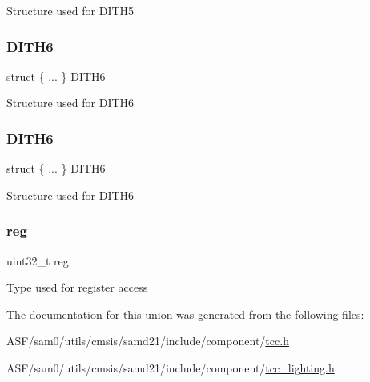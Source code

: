 Structure used for D\+I\+T\+H5 \mbox{\label{union_t_c_c___c_o_u_n_t___type_a3c35854a6526ba867ee4b060fb0174b6}} 
\subsubsection{\texorpdfstring{DITH6}{DITH6}\hspace{0.1cm}{\footnotesize\ttfamily [1/2]}}
{\footnotesize\ttfamily struct \{ ... \}   D\+I\+T\+H6}

Structure used for D\+I\+T\+H6 \mbox{\label{union_t_c_c___c_o_u_n_t___type_a45cbfa4ced52916c3eb023e920cc0015}} 
\subsubsection{\texorpdfstring{DITH6}{DITH6}\hspace{0.1cm}{\footnotesize\ttfamily [2/2]}}
{\footnotesize\ttfamily struct \{ ... \}   D\+I\+T\+H6}

Structure used for D\+I\+T\+H6 \mbox{\label{union_t_c_c___c_o_u_n_t___type_a6b91636401516a477989a336376d7b40}} 
\subsubsection{\texorpdfstring{reg}{reg}}
{\footnotesize\ttfamily uint32\+\_\+t reg}

Type used for register access 

The documentation for this union was generated from the following files\+:\begin{DoxyCompactItemize}
\item 
A\+S\+F/sam0/utils/cmsis/samd21/include/component/\mbox{\hyperlink{tcc_8h}{tcc.\+h}}\item 
A\+S\+F/sam0/utils/cmsis/samd21/include/component/\mbox{\hyperlink{tcc__lighting_8h}{tcc\+\_\+lighting.\+h}}\end{DoxyCompactItemize}
